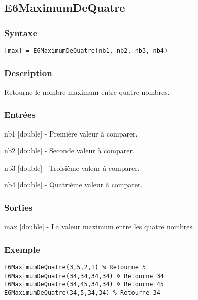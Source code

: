 \begin{minipage}{\linewidth}
\subsection*{E6MaximumDeQuatre}
\subsubsection*{Syntaxe}
\begin{lstlisting}
[max] = E6MaximumDeQuatre(nb1, nb2, nb3, nb4)
\end{lstlisting}
\subsubsection*{Description}
Retourne le nombre maximum entre quatre nombres.
\subsubsection*{Entrées}
\begin{description}
\item nb1 [double] - Première valeur à comparer. 
\item nb2 [double] - Seconde valeur à comparer. 
\item nb3 [double] - Troisième valeur à comparer. 
\item nb4 [double] - Quatrième valeur à comparer. 
\end{description} \subsubsection*{Sorties}
\begin{description}
\item max [double] - La valeur maximum entre les quatre nombres. 
\end{description} 
\subsubsection*{Exemple}
\begin{lstlisting}
E6MaximumDeQuatre(3,5,2,1) % Retourne 5 
E6MaximumDeQuatre(34,34,34,34) % Retourne 34 
E6MaximumDeQuatre(34,45,34,34) % Retourne 45 
E6MaximumDeQuatre(34,5,34,34) % Retourne 34
\end{lstlisting} \medskip
\end{minipage}
